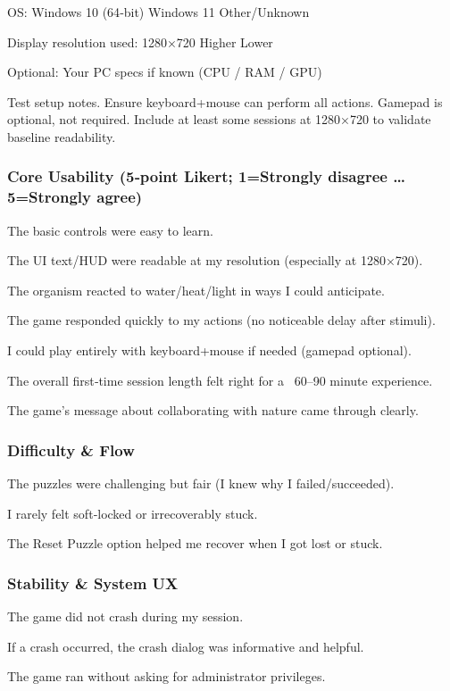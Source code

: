\documentclass[12pt, titlepage]{article}
\begin{document}
OS:  Windows 10 (64‑bit)  Windows 11  Other/Unknown

Display resolution used:  1280×720  Higher  Lower

Optional: Your PC specs if known (CPU / RAM / GPU)

Test setup notes. Ensure keyboard+mouse can perform all actions. Gamepad is optional, not required. Include at least some sessions at 1280×720 to validate baseline readability.

\subsubsection{Core Usability (5‑point Likert; 1=Strongly disagree … 5=Strongly agree)}

The basic controls were easy to learn.

The UI text/HUD were readable at my resolution (especially at 1280×720).

The organism reacted to water/heat/light in ways I could anticipate.

The game responded quickly to my actions (no noticeable delay after stimuli).

I could play entirely with keyboard+mouse if needed (gamepad optional).

The overall first‑time session length felt right for a ~60–90 minute experience.

The game’s message about collaborating with nature came through clearly.

\subsubsection{Difficulty \& Flow}

The puzzles were challenging but fair (I knew why I failed/succeeded).

I rarely felt soft‑locked or irrecoverably stuck.

The Reset Puzzle option helped me recover when I got lost or stuck.

\subsubsection{Stability \& System UX}

The game did not crash during my session.

If a crash occurred, the crash dialog was informative and helpful.

The game ran without asking for administrator privileges.
\end{document}
